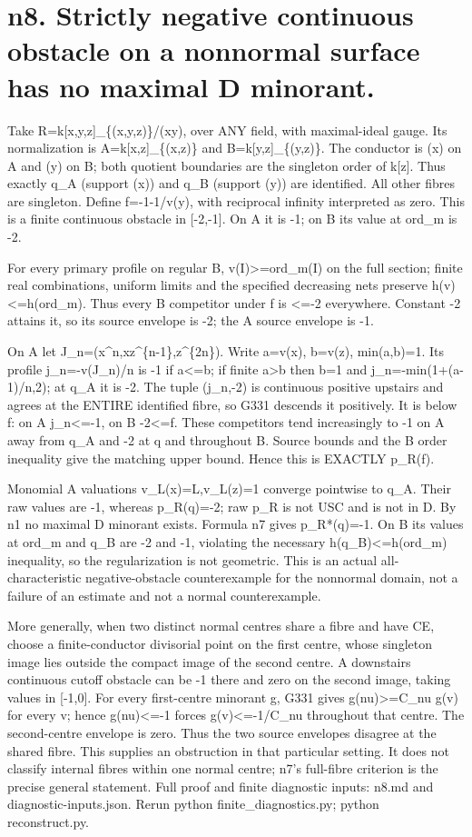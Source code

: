 \documentclass[11pt]{article}
\begin{document}
\section*{n8. Strictly negative continuous obstacle on a nonnormal surface has no maximal D minorant.}
Take R=k[x,y,z]\_\{(x,y,z)\}/(xy), over ANY field, with maximal-ideal gauge. Its normalization is A=k[x,z]\_\{(x,z)\} and B=k[y,z]\_\{(y,z)\}. The conductor is (x) on A and (y) on B; both quotient boundaries are the singleton order of k[z]. Thus exactly q\_A (support (x)) and q\_B (support (y)) are identified. All other fibres are singleton. Define f=-1-1/v(y), with reciprocal infinity interpreted as zero. This is a finite continuous obstacle in [-2,-1]. On A it is -1; on B its value at ord\_m is -2.

For every primary profile on regular B, v(I)>=ord\_m(I) on the full section; finite real combinations, uniform limits and the specified decreasing nets preserve h(v)<=h(ord\_m). Thus every B competitor under f is <=-2 everywhere. Constant -2 attains it, so its source envelope is -2; the A source envelope is -1.

On A let J\_n=(x\textasciicircum{}n,xz\textasciicircum{}\{n-1\},z\textasciicircum{}\{2n\}). Write a=v(x), b=v(z), min(a,b)=1. Its profile j\_n=-v(J\_n)/n is -1 if a<=b; if finite a>b then b=1 and j\_n=-min(1+(a-1)/n,2); at q\_A it is -2. The tuple (j\_n,-2) is continuous positive upstairs and agrees at the ENTIRE identified fibre, so G331 descends it positively. It is below f: on A j\_n<=-1, on B -2<=f. These competitors tend increasingly to -1 on A away from q\_A and -2 at q and throughout B. Source bounds and the B order inequality give the matching upper bound. Hence this is EXACTLY p\_R(f).

Monomial A valuations v\_L(x)=L,v\_L(z)=1 converge pointwise to q\_A. Their raw values are -1, whereas p\_R(q)=-2; raw p\_R is not USC and is not in D. By n1 no maximal D minorant exists. Formula n7 gives p\_R*(q)=-1. On B its values at ord\_m and q\_B are -2 and -1, violating the necessary h(q\_B)<=h(ord\_m) inequality, so the regularization is not geometric. This is an actual all-characteristic negative-obstacle counterexample for the nonnormal domain, not a failure of an estimate and not a normal counterexample.

More generally, when two distinct normal centres share a fibre and have CE, choose a finite-conductor divisorial point on the first centre, whose singleton image lies outside the compact image of the second centre. A downstairs continuous cutoff obstacle can be -1 there and zero on the second image, taking values in [-1,0]. For every first-centre minorant g, G331 gives g(nu)>=C\_nu g(v) for every v; hence g(nu)<=-1 forces g(v)<=-1/C\_nu throughout that centre. The second-centre envelope is zero. Thus the two source envelopes disagree at the shared fibre. This supplies an obstruction in that particular setting. It does not classify internal fibres within one normal centre; n7's full-fibre criterion is the precise general statement. Full proof and finite diagnostic inputs: n8.md and diagnostic-inputs.json. Rerun python finite\_diagnostics.py; python reconstruct.py.
\end{document}
